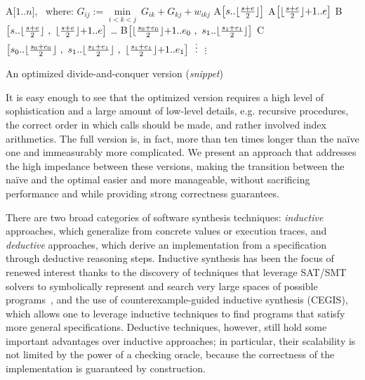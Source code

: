\begin{algorithm}[b!]
\begin{algorithmic}
  \State A[$1..n$], ~where:
	      \State $G_{ij} := \underset{i<k<j}\min ~ G_{ik} + G_{kj} + w_{ikj}$
	    \EndFor
	  \EndFor
	\Else
	  \State A$\big[ s..\lfloor\frac{s+e}{2}\rfloor \big]$
	  \State A$\big[ \lfloor\frac{s+e}{2}\rfloor{+}1..e \big]$
	  \State B$\big[ s..\lfloor\frac{s+e}{2}\rfloor ~,~ \lfloor\frac{s+e}{2}\rfloor{+}1..e \big]$
	\EndIf
  \EndProcedure
	 \ldots
	\Else
	  \State B$\big[ \lfloor\frac{s_0+e_0}{2}\rfloor{+}1..e_0 ~,~ s_1..\lfloor\frac{s_1+e_1}{2}\rfloor \big]$
	  \State C$\big[ s_0..\lfloor\frac{s_0+e_0}{2}\rfloor ~,~ s_1..\lfloor\frac{s_1+e_1}{2}\rfloor ~,~ \lfloor\frac{s_1+e_1}{2}\rfloor{+}1..e_1 \big]$
	  \vspace{-5pt}
	  \State $\vdotswithin{C}$
	\EndIf
  \EndProcedure
    \vspace{-5pt}
    \State $\vdots$
  \EndProcedure
\end{algorithmic}
\caption{\label{intro:divide-and-conquer}
   An optimized divide-and-conquer version (\textit{snippet})}
\end{algorithm}

It is easy enough to see that the optimized version requires a high level of
sophistication and a large amount of low-level details, e.g. recursive procedures,
the correct order in which calls should be made, and rather involved index
arithmetics. The full version is, in fact, more than ten times longer than the
na\"ive one and immeasurably more complicated. We present an approach that addresses
the high impedance between these versions, making the transition between the na\"ive
and the optimal easier and more manageable, without sacrificing performance and while
providing strong correctness guarantees.

There are two broad categories of software synthesis techniques: 
\emph{inductive} approaches, which generalize from concrete values or execution traces, and \emph{deductive} approaches, which derive an implementation from a specification through deductive reasoning steps. Inductive synthesis has been the focus of renewed interest thanks to the discovery of techniques that leverage SAT/SMT solvers to symbolically represent and search very large spaces of possible programs~\cite{APLAS09/Solar-Lezama, PLDI11/Gulwani, Onward13/Torlak}, and the use of counterexample-guided inductive synthesis (CEGIS), which allows one to leverage inductive techniques to find programs that satisfy more general specifications. Deductive techniques, however, still hold some important advantages over inductive approaches; in particular, their scalability is not limited by the power of a checking oracle, because the correctness of the implementation is guaranteed by construction.

